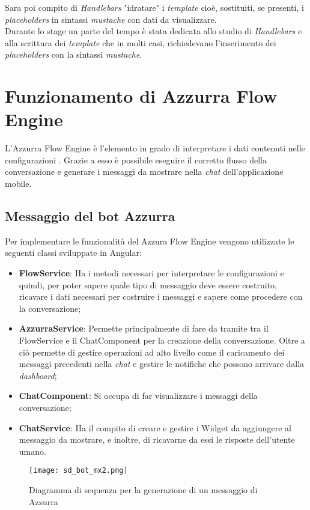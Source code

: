  Sara poi compito di \emph{Handlebars} "idratare" i \emph{template} cioè,  sostituiti, se presenti, i \emph{placeholders} in sintassi \emph{mustache} con dati da visualizzare.\\

 Durante lo stage un parte del tempo è stata dedicata allo studio di \emph{Handlebars} e alla scrittura dei \emph{template} che in molti casi, richiedevano l'inserimento dei \emph{placeholders} con la sintassi \emph{mustache}.
 

\section{Funzionamento di Azzurra Flow Engine}
L'Azzurra Flow Engine è l'elemento in grado di interpretare i dati contenuti nelle configurazioni . Grazie a esso è possibile eseguire il corretto flusso della conversazione e generare i messaggi da mostrare nella \emph{chat} dell'applicazione mobile. 
\subsection{Messaggio del bot Azzurra}
Per implementare le funzionalità del Azzura Flow Engine vengono utilizzate le seguenti classi sviluppate in Angular:
\begin{itemize}
	\item \textbf{FlowService}: Ha i metodi necessari per interpretare le configurazioni  e quindi, per poter sapere quale tipo di messaggio deve essere costruito, ricavare i dati necessari per costruire i messaggi e sapere come procedere con la conversazione;
	\item \textbf{AzzurraService}: Permette principalmente di fare da tramite tra il FlowService e il ChatComponent per la creazione della conversazione. Oltre a ciò permette di gestire operazioni ad alto livello come il caricamento dei messaggi precedenti nella \emph{chat} e gestire le notifiche che possono arrivare dalla \emph{dashboard};
	\item \textbf{ChatComponent}: Si occupa di far visualizzare i messaggi della conversazione;
	\item \textbf{ChatService}: Ha il compito di creare e gestire i Widget da aggiungere al messaggio da mostrare, e inoltre, di ricavarne da essi le risposte dell'utente umano.
\end{itemize}

\begin{figure}[htbp]
	\centering
	\texttt{[image: sd\_bot\_mx2.png]}
	\caption{Diagramma di sequenza per la generazione di un messaggio di Azzurra}\label{fig:mxBot}
\end{figure}


